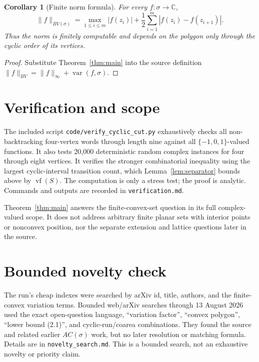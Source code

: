 \documentclass[11pt]{article}
\newtheorem{corollary}{Corollary}
\newcommand{\C}{\mathbb C}
\newcommand{\vf}{\operatorname{vf}}
\newcommand{\Var}{\operatorname{var}}
\begin{document}
\begin{corollary}[Finite norm formula]
For every $f:\sigma\to\C$,
\[
 \lVert f\rVert_{BV(\sigma)}
 =\max_{1\leq i\leq m}|f(z_i)|
 +\frac12\sum_{i=1}^{m}|f(z_i)-f(z_{i+1})|.
\]
Thus the norm is finitely computable and depends on the polygon only through
the cyclic order of its vertices.
\end{corollary}

\begin{proof}
Substitute Theorem~\ref{thm:main} into the source definition
$\lVert f\rVert_{BV}=\lVert f\rVert_\infty+\Var(f,\sigma)$.
\end{proof}

\section{Verification and scope}

The included script \texttt{code/verify\_cyclic\_cut.py} exhaustively checks
all non-backtracking four-vertex words through length nine against all
$\{-1,0,1\}$-valued functions.  It also tests 20,000 deterministic random
complex instances for four through eight vertices.  It verifies the stronger
combinatorial inequality using the largest cyclic-interval transition count,
which Lemma~\ref{lem:separator} bounds above by $\vf(S)$.  The computation is
only a stress test; the proof is analytic.  Commands and outputs are recorded
in \texttt{verification.md}.

Theorem~\ref{thm:main} answers the finite-convex-set question in its full
complex-valued scope.  It does not address arbitrary finite planar sets with
interior points or nonconvex position, nor the separate extension and lattice
questions later in the source.

\section{Bounded novelty check}

The run's cheap indexes were searched by arXiv id, title, authors, and the
finite-convex variation terms.  Bounded web/arXiv searches through
13 August 2026 used the exact open-question language, ``variation factor'',
``convex polygon'', ``lower bound (2.1)'', and cyclic-run/coarea combinations.
They found the source and related earlier $AC(\sigma)$ work, but no later
resolution or matching formula.  Details are in
\texttt{novelty\_search.md}.  This is a bounded search, not an exhaustive
novelty or priority claim.
\end{document}

